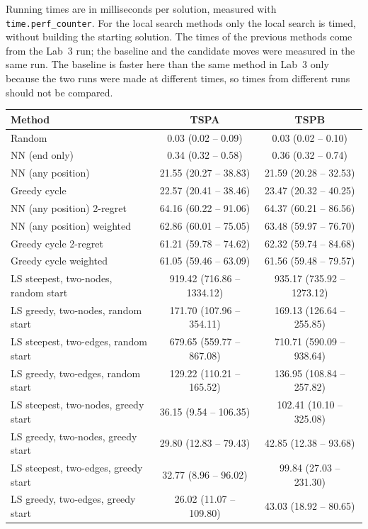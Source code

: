 \documentclass[11pt,a4paper]{article}
\begin{document}
Running times are in milliseconds per solution, measured with \texttt{time.perf\_counter}. For the
local search methods only the local search is timed, without building the starting solution. The
times of the previous methods come from the Lab~3 run; the baseline and the candidate moves were
measured in the same run. The baseline is faster here than the same method in Lab~3 only because the
two runs were made at different times, so times from different runs should not be compared.
\begin{table}[H]
\centering
\small
\begin{tabular}{lcc}
\toprule
Method & TSPA & TSPB \\
\midrule
Random & 0.03 (0.02 -- 0.09) & 0.03 (0.02 -- 0.10) \\
NN (end only) & 0.34 (0.32 -- 0.58) & 0.36 (0.32 -- 0.74) \\
NN (any position) & 21.55 (20.27 -- 38.83) & 21.59 (20.28 -- 32.53) \\
Greedy cycle & 22.57 (20.41 -- 38.46) & 23.47 (20.32 -- 40.25) \\
NN (any position) 2-regret & 64.16 (60.22 -- 91.06) & 64.37 (60.21 -- 86.56) \\
NN (any position) weighted & 62.86 (60.01 -- 75.05) & 63.48 (59.97 -- 76.70) \\
Greedy cycle 2-regret & 61.21 (59.78 -- 74.62) & 62.32 (59.74 -- 84.68) \\
Greedy cycle weighted & 61.05 (59.46 -- 63.09) & 61.56 (59.48 -- 79.57) \\
LS steepest, two-nodes, random start & 919.42 (716.86 -- 1334.12) & 935.17 (735.92 -- 1273.12) \\
LS greedy, two-nodes, random start & 171.70 (107.96 -- 354.11) & 169.13 (126.64 -- 255.85) \\
LS steepest, two-edges, random start & 679.65 (559.77 -- 867.08) & 710.71 (590.09 -- 938.64) \\
LS greedy, two-edges, random start & 129.22 (110.21 -- 165.52) & 136.95 (108.84 -- 257.82) \\
LS steepest, two-nodes, greedy start & 36.15 (9.54 -- 106.35) & 102.41 (10.10 -- 325.08) \\
LS greedy, two-nodes, greedy start & 29.80 (12.83 -- 79.43) & 42.85 (12.38 -- 93.68) \\
LS steepest, two-edges, greedy start & 32.77 (8.96 -- 96.02) & 99.84 (27.03 -- 231.30) \\
LS greedy, two-edges, greedy start & 26.02 (11.07 -- 109.80) & 43.03 (18.92 -- 80.65) \\

\end{tabular}
\end{table}
\end{document}
